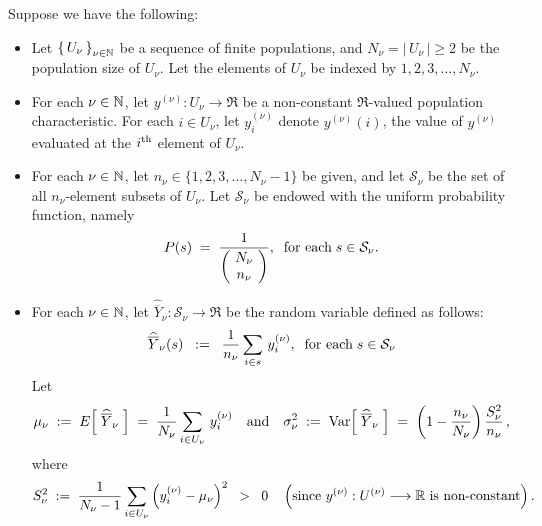 \begin{theorem}
\label{HajekCLTSRSWOR}
\mbox{}
\vskip 0.1cm
\noindent
Suppose we have the following:
\begin{itemize}
\item Let $\left\{\,U_{\nu}\,\right\}_{\nu \in \mathbb{N}}$ be a sequence of finite populations,
and $N_{\nu} = \left\vert\,U_{\nu}\,\right\vert \geq 2$ be the population size of $U_{\nu}$.
Let the elements of $U_{\nu}$ be indexed by $1,2,3,\ldots,N_{\nu}$.
\item For each $\nu \in \mathbb{N}$, let $y^{(\nu)} : U_{\nu} \longrightarrow \Re$ be a non-constant $\Re$-valued population characteristic.
For each $i \in U_{\nu}$, let $y^{(\nu)}_{i}$ denote $y^{(\nu)}(i)$,
the value of $y^{(\nu)}$ evaluated at the $i^{\textnormal{th}}$ element of $U_{\nu}$.
\item For each $\nu \in \mathbb{N}$, let $n_{\nu} \in \{ 1,2,3,\ldots,N_{\nu}-1 \}$ be given,
and let $\mathcal{S}_{\nu}$ be the set of all $n_{\nu}$-element subsets of $U_{\nu}$.
Let $\mathcal{S}_{\nu}$ be endowed with the uniform probability function, namely
\begin{equation*}
P(s) \; = \; \dfrac{1}{\left(\!\begin{array}{c} N_{\nu} \\ n_{\nu} \end{array}\!\right)},
\;\;\textnormal{for each}\; s \in \mathcal{S}_{\nu}.
\end{equation*}
\item For each $\nu \in \mathbb{N}$, let $\widehat{\overline{Y}}_{\nu} : \mathcal{S}_{\nu} \longrightarrow \Re$ be the random variable
defined as follows:
\begin{equation*}
\widehat{\overline{Y}}_{\nu}(s)
\;\;:=\;\;
\dfrac{1}{n_{\nu}}\sum_{i \in s}\, y^{(\nu)}_{i},
\;\;\textnormal{for each}\; s \in \mathcal{S}_{\nu}
\end{equation*}
Let
\begin{equation*}
\mu_{\nu} \;:=\; E\!\left[\;\widehat{\overline{Y}}_{\nu}\;\right] \;=\; \dfrac{1}{N_{\nu}}\sum_{i \in U_{\nu}}\,y^{(\nu)}_{i}
\quad\textnormal{and}\quad
\sigma^{2}_{\nu} \;:=\; \textnormal{Var}\!\left[\;\widehat{\overline{Y}}_{\nu}\;\right] \;=\; \left(1 - \dfrac{n_{\nu}}{N_{\nu}}\right)\dfrac{S^{2}_{\nu}}{n_{\nu}}\,,
\end{equation*}
where
\begin{equation*}
S^{2}_{\nu} \;:=\; \dfrac{1}{N_{\nu} - 1}\sum_{i \in U_{\nu}}\left(y^{(\nu)}_{i} - \mu_{\nu}\right)^{2}
\;\; > \;\; 0
\quad\left(\textnormal{since $y^{(\nu)} : U^{(\nu)} \longrightarrow \Re$ is non-constant}\right).

\end{equation*}
\end{itemize}
\end{theorem}
